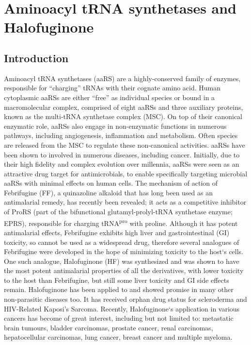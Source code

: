 \chapter{\label{ch:2-litreview}Aminoacyl tRNA synthetases and Halofuginone}

\section{Introduction}
Aminoacyl tRNA synthetases (aaRS) are a highly-conserved family of enzymes, responsible for ``charging'' tRNAs with their cognate amino acid.
Human cytoplasmic aaRSs are either ``free'' as individual species or bound in a macromolecular complex, comprised of eight aaRSs and three auxiliary proteins, known as the multi-tRNA synthetase complex (MSC).
On top of their canonical enzymatic role, aaRSs also engage in non-enzymatic functions in numerous pathways, including angiogenesis, inflammation and metabolism.
Often species are released from the MSC to regulate these non-canonical activities.
aaRSs have been shown to involved in numerous diseases, including cancer.
Initially, due to their high fidelity and complex evolution over millennia, aaRSs were seen as an attractive drug target for antimicrobials, to enable specifically targeting microbial aaRSs with minimal effects on human cells.
The mechanism of action of Febrifugine (FF), a quinazoline alkaloid that has long been used as an antimalarial remedy, has recently been revealed; it acts as a competitive inhibitor of ProRS (part of the bifunctional glutamyl-prolyl-tRNA synthetase enzyme; EPRS), responsible for charging tRNA\textsuperscript{pro} with proline.
Although it has potent antimalarial effects, Febrifugine exhibits high liver and gastrointestinal (GI) toxicity, so cannot be used as a widespread drug, therefore several analogues of Febrifugine were developed in the hope of minimizing toxicity to the host`s cells.
One such analogue, Halofuginone (HF) was synthesized and was shown to have the most potent antimalarial properties of all the derivatives, with lower toxicity to the host than Febrifugine, but still some liver toxicity and GI side effects remain.
Halofuginone has been applied to and showed promise in many other non-parasitic diseases too.
It has received orphan drug status for scleroderma and HIV-Related Kaposi's Sarcoma.
Recently, Halofuginone`s application in various cancers has become of great interest, including but not limited to: metastatic brain tumours, bladder carcinomas, prostate cancer, renal carcinomas, hepatocellular carcinomas, lung cancer, breast cancer and multiple myeloma.


